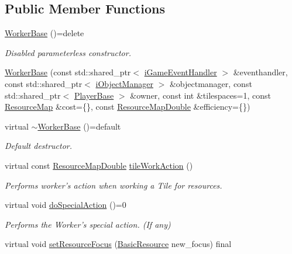 \subsection*{Public Member Functions}
\begin{DoxyCompactItemize}
\item 
\hyperlink{classCourse_1_1WorkerBase_a419f5f52654b70d123ea0c24bd94e091}{Worker\-Base} ()=delete
\begin{DoxyCompactList}\small\item\em Disabled parameterless constructor. \end{DoxyCompactList}\item 
\hyperlink{classCourse_1_1WorkerBase_af3dc160af36133a23d6e5bcd1ffe347e}{Worker\-Base} (const std\-::shared\-\_\-ptr$<$ \hyperlink{classCourse_1_1iGameEventHandler}{i\-Game\-Event\-Handler} $>$ \&eventhandler, const std\-::shared\-\_\-ptr$<$ \hyperlink{classCourse_1_1iObjectManager}{i\-Object\-Manager} $>$ \&objectmanager, const std\-::shared\-\_\-ptr$<$ \hyperlink{classCourse_1_1PlayerBase}{Player\-Base} $>$ \&owner, const int \&tilespaces=1, const \hyperlink{namespaceCourse_ab9a46ed9cd00485e318e5731ea2f78d9}{Resource\-Map} \&cost=\{\}, const \hyperlink{namespaceCourse_a0b96bae1a664dde34efbb1b42dea615e}{Resource\-Map\-Double} \&efficiency=\{\})
\item 
virtual \hyperlink{classCourse_1_1WorkerBase_a6711f994b4426907026fcc07ee77b429}{$\sim$\-Worker\-Base} ()=default
\begin{DoxyCompactList}\small\item\em Default destructor. \end{DoxyCompactList}\item 
virtual const \hyperlink{namespaceCourse_a0b96bae1a664dde34efbb1b42dea615e}{Resource\-Map\-Double} \hyperlink{classCourse_1_1WorkerBase_af0c1bb4f3bbea015e2a55aa6eff7f9ae}{tile\-Work\-Action} ()
\begin{DoxyCompactList}\small\item\em Performs worker's action when working a Tile for resources. \end{DoxyCompactList}\item 
virtual void \hyperlink{classCourse_1_1WorkerBase_a78553f35740e1c07d8f1071b5fc82212}{do\-Special\-Action} ()=0
\begin{DoxyCompactList}\small\item\em Performs the Worker's special action. (If any) \end{DoxyCompactList}\item 
virtual void \hyperlink{classCourse_1_1WorkerBase_a30335f9647eba9d04514be4bff059a6b}{set\-Resource\-Focus} (\hyperlink{namespaceCourse_a02d49c04029594d4adba79b84bb85f65}{Basic\-Resource} new\-\_\-focus) final

\end{DoxyCompactItemize}
